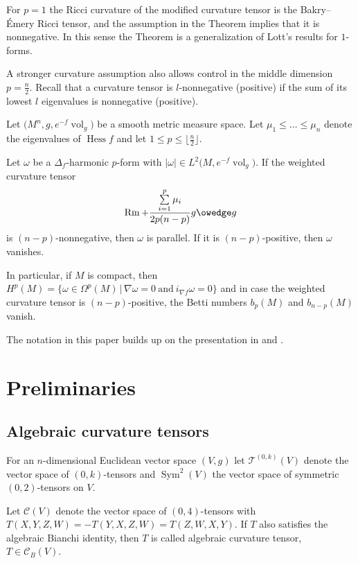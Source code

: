 \documentclass[pdftex]{sigma}
\numberwithin{equation}{section}
\newcommand{\vol}{\operatorname{vol}}
\newcommand{\Hess} {\operatorname{Hess}}
\newcommand{\Rm} {\operatorname{Rm}}
\begin{document}
For $p=1$ the Ricci curvature of the modified curvature tensor is the Bakry--\'Emery Ricci tensor, and the assumption in the Theorem implies that it is nonnegative. In this sense the Theorem is a generalization of Lott's \cite{LottGeometryBETensor} results for $1$-forms.


A stronger curvature assumption also allows control in the middle dimension $p = \frac{n}{2}$. Recall that a curvature tensor is $l$-nonnegative (positive) if the sum of its lowest $l$ eigenvalues is nonnegative (positive).

\begin{proposition*}
Let $\big(M^n,g, e^{-f} \vol_g\big)$ be a smooth metric measure space. Let $\mu_1 \leq \dots \leq \mu_n$ denote the eigenvalues of $\Hess f$ and let $1 \leq p \leq \big\lfloor  \frac{n}{2}\big\rfloor$.

Let $\omega$ be a $\Delta_f$-harmonic $p$-form with $|\omega| \in L^2\big(M, e^{-f} \vol_g\big)$. If the weighted curvature tensor
\begin{gather*}
\Rm + \frac{\sum\limits_{i=1}^p \mu_i}{2p(n-p)} g \owedge g
\end{gather*}
is $(n-p)$-nonnegative, then $\omega$ is parallel. If it is $(n-p)$-positive, then $\omega$ vanishes.

In particular, if $M$ is compact, then $H^{p}(M)= \big\lbrace \omega \in \Omega^p(M) \, \vert \, \nabla \omega =0 \ \text{and} \ i_{\nabla f} \omega = 0 \big\rbrace$ and in case the weighted curvature tensor is $(n-p)$-positive, the Betti numbers $b_p(M)$ and $b_{n-p}(M)$ vanish.
\end{proposition*}

The notation in this paper builds up on the presentation in \cite[Chapter~9]{PetersenRiemGeom} and \cite{PetersenWinkBochner}.

\section{Preliminaries}

\subsection{Algebraic curvature tensors}
For an $n$-dimensional Euclidean vector space $(V,g)$ let $\mathcal{T}^{(0,k)}(V)$ denote the vector space of $(0,k)$-tensors and $\operatorname{Sym}^2(V)$ the vector space of symmetric $(0,2)$-tensors on $V$.

Let $\mathcal{C}(V)$ denote the vector space of $(0,4)$-tensors with $T(X,Y,Z,W) = - T(Y,X,Z,W) = T(Z,W,X,Y)$. If $T$ also satisfies the algebraic Bianchi identity, then $T$ is called algebraic curvature tensor, $T \in \mathcal{C}_B(V)$.
\end{document}
